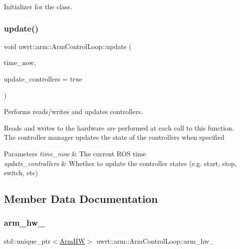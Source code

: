 Initializer for the class. 

\mbox{\label{classuwrt_1_1arm_1_1_arm_control_loop_a3f779ad43e5c210bf977469d25f15036}} 
\subsubsection{\texorpdfstring{update()}{update()}}
{\footnotesize\ttfamily void uwrt\+::arm\+::\+Arm\+Control\+Loop\+::update (\begin{DoxyParamCaption}\item[{const ros\+::\+Time \&}]{time\+\_\+now,  }\item[{bool}]{update\+\_\+controllers = {\ttfamily true} }\end{DoxyParamCaption})}



Performs reads/writes and updates controllers. 

Reads and writes to the hardware are performed at each call to this function. The controller manager updates the state of the controllers when specified


\begin{DoxyParams}{Parameters}
{\em time\+\_\+now} & The current R\+OS time \\
\hline
{\em update\+\_\+controllers} & Whether to update the controller states (e.\+g. start, stop, switch, etc) \\
\hline
\end{DoxyParams}


\subsection{Member Data Documentation}
\mbox{\label{classuwrt_1_1arm_1_1_arm_control_loop_ae28be35b3cf089ea2640f1104742cc32}} 
\subsubsection{\texorpdfstring{arm\+\_\+hw\+\_\+}{arm\_hw\_}}
{\footnotesize\ttfamily std\+::unique\+\_\+ptr$<$\hyperlink{classuwrt_1_1arm_1_1_arm_h_w}{Arm\+HW}$>$ uwrt\+::arm\+::\+Arm\+Control\+Loop\+::arm\+\_\+hw\+\_\+\hspace{0.3cm}{\ttfamily [protected]}}



